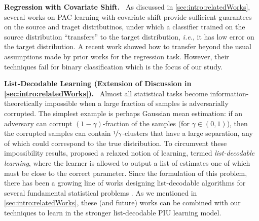 \documentclass[11pt]{article}
\theoremstyle{plain}
\theoremstyle{definition}
\theoremstyle{remark}
\newcommand{\nfrac}[2]{\nicefrac{#1}{#2}}
\renewcommand{\paragraph}[1]{\medskip \noindent\textbf{#1}~}
\newcommand{\ie}{\textit{i.e.}}
\begin{document}
            
             

        \paragraph{{Regression} with Covariate Shift.}
            As discussed in \cref{sec:intro:relatedWorks}, several works on PAC learning with covariate shift provide sufficient guarantees on the source and traget distributinos, under which a classifier trained on the source distribution ``transfers'' to the target distribution, \ie{}, it has low error on the target distribution.
            A recent work \citet{kalavasis2024transfer} showed how to transfer beyond the usual assumptions made by prior works for the regression task.
            However, their techniques fail for binary classification which is the focus of our study.


         
             

        \paragraph{List-Decodable Learning {(Extension of Discussion in \cref{sec:intro:relatedWorks})}.}
            Almost all statistical tasks become information-theoretically impossible when a large fraction of samples is adversarially corrupted.
            The simplest example is perhaps Gaussian mean estimation: if an adversary can corrupt $(1-\gamma)$-fraction of the samples (for $\gamma\in (0,1)$), then the corrupted samples can contain $\nfrac{1}{\gamma}$-clusters that have a large separation, any of which could correspond to the true distribution.
            To circumvent these impossibility results, \citet{charikar2017learning} proposed a relaxed notion of learning, termed \textit{list-decodable learning}, where the learner is allowed to output a list of estimates one of which must be close to the correct parameter.
            Since the formulation of this problem, there has been a growing line of works designing list-decodable algorithms for several fundamental statistical problems  \cite{charikar2017learning,karmalkar2019list,Cherapanamjeri2020DecodableNearlyLinear,bakshi2021Subspace,Abhimanyu2023DecodableBatches,Diakonikolas2023DecodableCovariance,kothari2022decodableCovariance,Raghavendra2020Decoding,Diakonikolas2022DecodableSparseMean,Diakonikolas2021SQ_LB_Decoding,Diakonikolas2021PCA_Decodable}.
            As we mentioned in \cref{sec:intro:relatedWorks}, these (and future) works can be combined with our techniques to learn in the stronger list-decodable PIU learning model.
\end{document}
